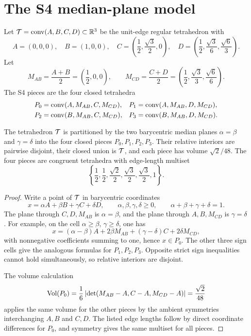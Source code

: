 \section{The S4 median-plane model}
\label{sec:model}

Let \(\mathcal T=\operatorname{conv}(A,B,C,D)\subset\mathbb R^3\) be the unit-edge regular tetrahedron with
\[
A=(0,0,0),\quad B=(1,0,0),\quad
C=\left(\frac{1}{2},\frac{\sqrt3}{2},0\right),\quad
D=\left(\frac{1}{2},\frac{\sqrt3}{6},\frac{\sqrt6}{3}\right).
\]
Let
\[
M_{AB}=\frac{A+B}{2}=\left(\frac{1}{2},0,0\right),\qquad
M_{CD}=\frac{C+D}{2}=\left(\frac{1}{2},\frac{\sqrt3}{3},\frac{\sqrt6}{6}\right).
\]
The S4 pieces are the four closed tetrahedra
\[
\begin{aligned}
P_0&=\operatorname{conv}(A,M_{AB},C,M_{CD}),&
P_1&=\operatorname{conv}(A,M_{AB},D,M_{CD}),\\
P_2&=\operatorname{conv}(B,M_{AB},C,M_{CD}),&
P_3&=\operatorname{conv}(B,M_{AB},D,M_{CD}).
\end{aligned}
\]

\begin{lemma}
\label{lem:tiling}
The tetrahedron \(\mathcal T\) is partitioned by the two barycentric median planes
\(\alpha=\beta\) and \(\gamma=\delta\) into the four closed pieces
\(P_0,P_1,P_2,P_3\).  Their relative interiors are pairwise disjoint, their
closed union is \(\mathcal T\), and each piece has volume \(\sqrt2/48\).  The four
pieces are congruent tetrahedra with edge-length multiset
\[
\left\{ \frac{1}{2},\frac{1}{2},\frac{\sqrt2}{2},\frac{\sqrt3}{2},\frac{\sqrt3}{2},1\right\}.
\]
\end{lemma}

\begin{proof}
Write a point of \(\mathcal T\) in barycentric coordinates
\[
x=\alpha A+\beta B+\gamma C+\delta D,
\qquad \alpha,\beta,\gamma,\delta\ge0,
\qquad \alpha+\beta+\gamma+\delta=1.
\]
The plane through \(C,D,M_{AB}\) is \(\alpha=\beta\), and the plane through
\(A,B,M_{CD}\) is \(\gamma=\delta\).  For example, on the cell
\(\alpha\ge\beta\), \(\gamma\ge\delta\), one has
\[
x=(\alpha-\beta)A+2\beta M_{AB}+(\gamma-\delta)C+2\delta M_{CD},
\]
with nonnegative coefficients summing to one, hence \(x\in P_0\).  The other
three sign cells give the analogous formulas for \(P_1,P_2,P_3\).  Opposite
strict sign inequalities cannot hold simultaneously, so relative interiors are
disjoint.

The volume calculation
\[
\operatorname{Vol}(P_0)=\frac{1}{6}\left|\det(M_{AB}-A, C-A, M_{CD}-A)\right|=\frac{\sqrt2}{48}
\]
applies the same volume for the other pieces by the ambient symmetries
interchanging \(A,B\) and \(C,D\).  The listed edge lengths follow by direct
coordinate differences for \(P_0\), and symmetry gives the same multiset for
all pieces.
\end{proof}


